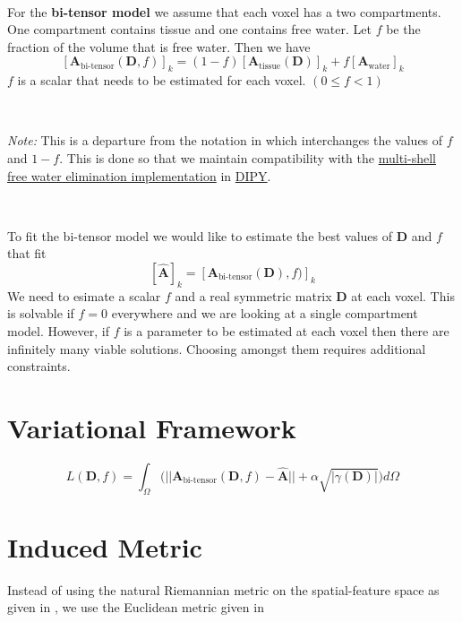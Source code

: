 \documentclass[12pt]{article}
\newcommand{\vect}[1]{\mathbf{#1}}
\begin{document}
\ 

\noindent
For the \textbf{bi-tensor model} we assume that each voxel has a two
compartments. One compartment contains tissue and one contains free water. Let
$f$ be the fraction of the volume that is free water. Then we have 
$$[\vect{A}_{\text{bi-tensor}}(\vect{D},f)]_k = 
  (1-f)[\vect{A}_{\text{tissue}}(\vect{D})]_k +
  f [\vect{A}_{\text{water}}]_k$$
$f$ is a scalar that needs to be estimated for each voxel. $(0 \leq f < 1)$

\ 

\noindent
\textit{Note:} This is a departure from the notation in \cite{Pasternak2009}
which interchanges the values of $f$ and $1-f$. This is done so that we
maintain compatibility with the
\href{http://nipy.org/dipy/examples\_built/reconst\_fwdti.html}{multi-shell
free water elimination implementation} in \href{http://nipy.org/dipy}{DIPY}. 

\ 

\noindent
To fit the bi-tensor model we would like to estimate the best values of
$\vect{D}$ and $f$ that fit $$ [\hat{\vect{A}}]_k =
[\vect{A}_{\text{bi-tensor}}(\vect{D}), f)]_k$$ We need to esimate a scalar
$f$ and a real symmetric matrix $\vect{D}$ at each voxel. This is solvable if
$f=0$ everywhere and we are looking at a single compartment model. However, if
$f$ is a parameter to be estimated at each voxel then there are infinitely many
viable solutions. Choosing amongst them requires additional constraints. 

\section{Variational Framework}


$$L(\vect{D}, f) = \int_\Omega \big( ||\vect{A}_{\text{bi-tensor}}(\vect{D}, f)
- \hat{\vect{A}}|| + \alpha \sqrt{|\gamma(\vect{D})|} \big) d\Omega$$


\section{Induced Metric}

Instead of using the natural Riemannian metric on the spatial-feature space as
given in \cite{Pasternak2009}, we use the Euclidean metric given in
\cite{Pasternak2014} 
\end{document}
